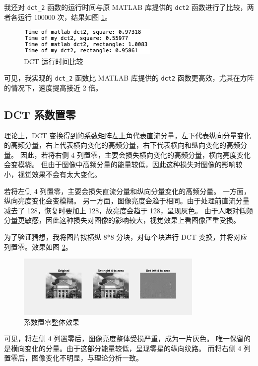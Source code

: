 \documentclass[a4paper]{article}  %
\begin{document}
我还对 \texttt{dct\_2} 函数的运行时间与原 MATLAB 库提供的 \texttt{dct2} 函数进行了比较，两者各运行 100000 次，结果如图 \ref{fig:2_2_time}。

\begin{figure}[ht]
    \centering
    \includegraphics[width=0.6\textwidth]{asserts/2_2_time.png}
    \caption{
        DCT 运行时间比较
    }\label{fig:2_2_time}
\end{figure}

可见，我实现的 \texttt{dct\_2} 函数比 MATLAB 库提供的 \texttt{dct2} 函数更高效，尤其在方阵的情况下，速度提高接近 2 倍。


\subsection{DCT 系数置零}

理论上，DCT 变换得到的系数矩阵左上角代表直流分量，左下代表纵向分量变化的高频分量，右上代表横向变化的高频分量，右下代表横向和纵向变化的高频分量。
因此，若将右侧 4 列置零，主要会损失横向变化的高频分量，横向亮度变化会变模糊。
但由于图像中高频分量的能量较低，因此这种损失对图像的影响较小，视觉效果不会有太大变化。

若将左侧 4 列置零，主要会损失直流分量和纵向分量变化的高频分量。
一方面，纵向亮度变化会变模糊。
另一方面，图像亮度会趋于相同。由于处理前直流分量减去了 128，恢复时要加上 128，故亮度会趋于 128，呈现灰色。
由于人眼对低频分量更敏感，因此这种损失对图像的影响较大，视觉效果上看图像严重受损。

为了验证猜想，我将图片按横纵 8*8 分块，对每个块进行 DCT 变换，并将对应列置零。效果如图 \ref{fig:2_3_image}。

\begin{figure}[ht]
    \centering
    \includegraphics[width=0.8\textwidth]{asserts/2_3_image.png}
    \caption{
        系数置零整体效果
    }\label{fig:2_3_image}
\end{figure}

可见，将左侧 4 列置零后，图像亮度整体受损严重，成为一片灰色。
唯一保留的是横向变化的分量。由于这部分能量较低，呈现零星的纵向纹路。
而将右侧 4 列置零后，图像变化不明显，与理论分析一致。
\end{document}
